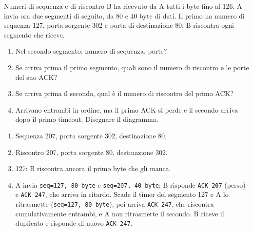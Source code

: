 \begin{esercizio}{Numeri di sequenza e di riscontro}
B ha ricevuto da A tutti i byte fino al 126. A invia ora due segmenti di seguito, da 80 e 40 byte di dati. Il primo ha numero di sequenza
127, porta sorgente 302 e porta di destinazione 80. B riscontra ogni segmento che riceve.
\begin{enumerate}[label=(\alph*)]
    \item Nel secondo segmento: numero di sequenza, porte?
    \item Se arriva prima il primo segmento, quali sono il numero di riscontro e le porte del suo ACK?
    \item Se arriva prima il secondo, qual è il numero di riscontro del primo ACK?
    \item Arrivano entrambi in ordine, ma il primo ACK si perde e il secondo arriva dopo il primo timeout. Disegnare il diagramma.
\end{enumerate}

\svolgimento
\begin{enumerate}[label=(\alph*)]
    \item Sequenza 207, porta sorgente 302, destinazione 80.
    \item Riscontro 207, porta sorgente 80, destinazione 302.
    \item 127: B riscontra ancora il primo byte che gli manca.
    \item A invia \texttt{seq=127, 80 byte} e \texttt{seq=207, 40 byte}; B risponde \texttt{ACK 207} (perso) e \texttt{ACK 247}, che
          arriva in ritardo. Scade il timer del segmento 127 e A lo ritrasmette (\texttt{seq=127, 80 byte}); poi arriva \texttt{ACK 247},
          che riscontra cumulativamente entrambi, e A non ritrasmette il secondo. B riceve il duplicato e risponde di nuovo \texttt{ACK 247}.
\end{enumerate}
\end{esercizio}

